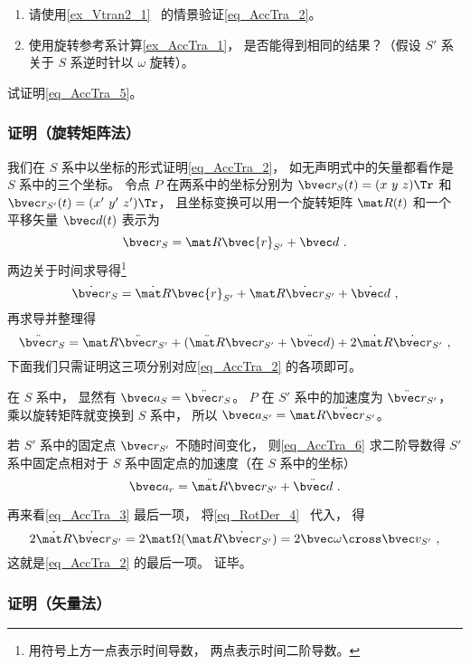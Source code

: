 \begin{exercise}{}\label{exe_AccTra_1}
\begin{enumerate}
\item 请使用\autoref{ex_Vtran2_1}~ 的情景验证\autoref{eq_AccTra_2}。
\item 使用旋转参考系计算\autoref{ex_AccTra_1}， 是否能得到相同的结果？（假设 $S'$ 系关于 $S$ 系逆时针以 $\omega$ 旋转）。
\end{enumerate}
\end{exercise}

\begin{exercise}{}
试证明\autoref{eq_AccTra_5}。
\end{exercise}

\subsubsection{证明（旋转矩阵法）}
我们在 $S$ 系中以坐标的形式证明\autoref{eq_AccTra_2}， 如无声明式中的矢量都看作是 $S$ 系中的三个坐标。 令点 $P$ 在两系中的坐标分别为 $\bvec r_S(t) = (x\ y\ z)\Tr$ 和 $\bvec r_{S'}(t) = (x'\ y'\ z')\Tr$， 且坐标变换可以用一个旋转矩阵 $\mat R(t)$ 和一个平移矢量 $\bvec d(t)$ 表示为
\begin{equation}\label{eq_AccTra_6}
\bvec r_S = \mat R \bvec{r}_{S'} + \bvec d~.
\end{equation}
两边关于时间求导得\footnote{用符号上方一点表示时间导数， 两点表示时间二阶导数。}
\begin{equation}
\dot{\bvec r}_S = \dot{\mat R} \bvec{r}_{S'} + \mat R \dot{\bvec r}_{S'}+ \dot{\bvec d}~,
\end{equation}
再求导并整理得
\begin{equation}\label{eq_AccTra_3}
\ddot{\bvec r}_S = \mat R \ddot{\bvec r}_{S'} + (\ddot{\mat R} \bvec r_{S'} + \ddot{\bvec d}) + 2 \dot{\mat R} \dot{\bvec r}_{S'}~,
\end{equation}
下面我们只需证明这三项分别对应\autoref{eq_AccTra_2} 的各项即可。

在 $S$ 系中， 显然有 $\bvec a_S = \ddot{\bvec r}_S$。 $P$ 在 $S'$ 系中的加速度为 $\ddot{\bvec r}_{S'}$， 乘以旋转矩阵就变换到 $S$ 系中， 所以 $\bvec a_{S'} = \mat R \ddot{\bvec r}_{S'}$。

若 $S'$ 系中的固定点 $\bvec r_{S'}$ 不随时间变化， 则\autoref{eq_AccTra_6} 求二阶导数得 $S'$ 系中固定点相对于 $S$ 系中固定点的加速度（在 $S$ 系中的坐标）
\begin{equation}
\bvec a_r = \ddot{\mat R} \bvec r_{S'} + \ddot{\bvec d}~.
\end{equation}


再来看\autoref{eq_AccTra_3} 最后一项， 将\autoref{eq_RotDer_4}~ 代入， 得
\begin{equation}
2\dot{\mat R} \dot{\bvec r}_{S'} = 2\mat\Omega (\mat R \dot{\bvec r}_{S'}) = 2\bvec \omega \cross \bvec v_{S'}~,
\end{equation}
这就是\autoref{eq_AccTra_2} 的最后一项。 证毕。

\subsubsection{证明（矢量法）}
